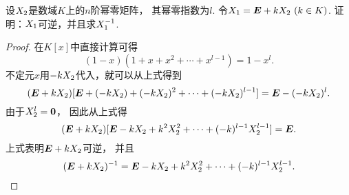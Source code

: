\begin{example}
设\(X_2\)是数域\(K\)上的\(n\)阶幂零矩阵，
其幂零指数为\(l\).
令\(X_1=\boldsymbol{E}+kX_2\ (k \in K)\).
证明：\(X_1\)可逆，并且求\(X_1^{-1}\).
\begin{proof}
在\(K[x]\)中直接计算可得\[
	(1-x)(1+x+x^2+\dotsb+x^{l-1})
	=1-x^l.
\]
不定元\(x\)用\(-kX_2\)代入，就可以从上式得到\[
	(\boldsymbol{E}+kX_2)[\boldsymbol{E}+(-kX_2)+(-kX_2)^2+\dotsb+(-kX_2)^{l-1}]
	=\boldsymbol{E}-(-kX_2)^l.
\]
由于\(X_2^l=\boldsymbol0\)，
因此从上式得\[
	(\boldsymbol{E}+kX_2)[\boldsymbol{E}-kX_2+k^2X_2^2+\dotsb+(-k)^{l-1}X_2^{l-1}]
	=\boldsymbol{E}.
\]
上式表明\(\boldsymbol{E}+kX_2\)可逆，
并且\[
	(\boldsymbol{E}+kX_2)^{-1}
	= \boldsymbol{E}-kX_2+k^2X_2^2+\dotsb+(-k)^{l-1}X_2^{l-1}.
	\qedhere
\]
\end{proof}
\end{example}
